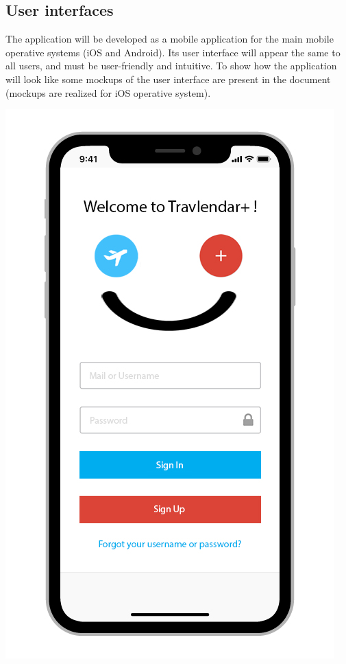 \subsection{User interfaces}
The application will be developed as a mobile application for the main mobile operative systems (iOS and Android).
Its user interface will appear the same to all users, and must be user-friendly and intuitive. To show how the application will look like some mockups of the user interface are present in the document (mockups are realized for iOS operative system).
\begin{center}
\includegraphics[scale=2.4]{MainMatter/images/ui/login}
\end{center}
